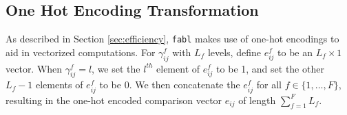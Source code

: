\documentclass[ba]{imsart}
\begin{document}
%	
%	
%			
%			
%			
%			
%			
	
	\hypertarget{app:ohe}{%
		\subsection{One Hot Encoding Transformation}\label{app:ohe}}
	
	As described in Section \ref{sec:efficiency}, \texttt{fabl} makes use of one-hot encodings to aid in vectorized computations. For $\gamma_{ij}^f$ with $L_f$ levels, define $e_{ij}^f$ to be an $L_f \times 1$ vector.  When $\gamma_{ij}^f = l$, we set the $l^{th}$ element of $e_{ij}^f$ to be 1, and set the other $L_f - 1$ elements of $e_{ij}^f$ to be 0. We then concatenate the $e_{ij}^f$ for all $f \in \{1, \ldots, F\}$, resulting in the one-hot encoded comparison vector $e_{ij}$ of length $\sum_{f=1}^F L_f$.
	
\end{document}
